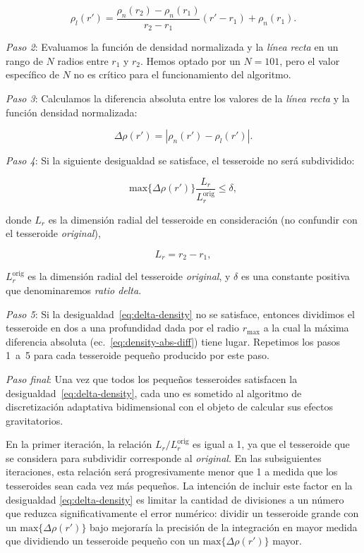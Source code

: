 \begin{equation}
    \rho_l(r') =
    \frac{ \rho_n(r_2) - \rho_n(r_1) }{ r_2 - r_1 } (r' - r_1) + \rho_n(r_1).
    \label{eq:density-reference-line}
\end{equation}

\textit{Paso 2}:
Evaluamos la función de densidad normalizada y la \emph{línea recta} en un
rango de $N$ radios entre $r_1$ y $r_2$. Hemos optado por un $N = 101$, pero el
valor específico de $N$ no es crítico para el funcionamiento del algoritmo.

\textit{Paso 3}:
Calculamos la diferencia absoluta entre los valores de la \emph{línea recta}
y la función densidad normalizada:

\begin{equation}
    \Delta \rho (r') = | \rho_n(r') - \rho_l(r') |.
    \label{eq:density-abs-diff}
\end{equation}

\textit{Paso 4}:
Si la siguiente desigualdad se satisface, el tesseroide no será subdividido:

\begin{equation}
    \text{max}\{ \Delta \rho(r') \} \frac{L_r}{L_r^\text{orig}} \le \delta,
    \label{eq:delta-density}
\end{equation}

\noindent donde $L_r$ es la dimensión radial del tesseroide en consideración
(no confundir con el tesseroide \emph{original}),

\begin{equation}
    L_r = r_2 - r_1,
\end{equation}

\noindent $L_r^\text{orig}$ es la dimensión radial del tesseroide
\emph{original}, y $\delta$ es una constante positiva que denominaremos
\emph{ratio delta}.

\textit{Paso 5}:
Si la desigualdad~\ref{eq:delta-density} no se satisface, entonces dividimos el
tesseroide en dos a una profundidad dada por el radio $r_\text{max}$ a la cual
la máxima diferencia absoluta (ec.~\ref{eq:density-abs-diff}) tiene lugar.
Repetimos los pasos 1~a~5 para cada tesseroide pequeño producido por este paso.

\textit{Paso final}:
Una vez que todos los pequeños tesseroides satisfacen la
desigualdad~\ref{eq:delta-density}, cada uno es sometido al algoritmo de
discretización adaptativa bidimensional con el objeto de calcular sus efectos
gravitatorios.

En la primer iteración, la relación $L_r/L_r^\text{orig}$ es igual a 1, ya que
el tesseroide que se considera para subdividir corresponde al \emph{original}.
En las subsiguientes iteraciones, esta relación será progresivamente menor que
1 a medida que los tesseroides sean cada vez más pequeños.
La intención de incluir este factor en la desigualdad \ref{eq:delta-density} es
limitar la cantidad de divisiones a un número que reduzca significativamente el
error numérico: dividir un tesseroide grande con un $\text{max}\{ \Delta
\rho(r') \}$ bajo mejoraría la precisión de la integración en mayor medida que
dividiendo un tesseroide pequeño con un $\text{max}\{ \Delta \rho(r') \}$
mayor.


